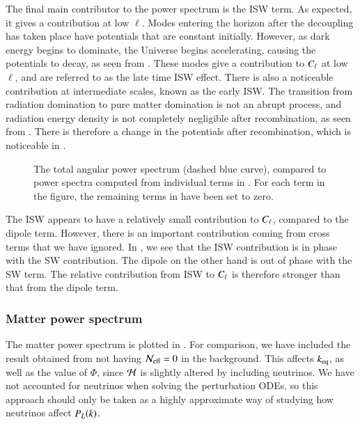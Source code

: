 The final main contributor to the power spectrum is the ISW term. As expected, it gives a contribution at low $\ell$. Modes entering the horizon after the decoupling has taken place have potentials that are constant initially. However, as dark energy begins to dominate, the Universe begins accelerating, causing the potentials to decay, as seen from . These modes give a contribution to $C_\ell$ at low $\ell$, and are referred to as the late time ISW effect. There is also a noticeable contribution at intermediate scales, known as the early ISW. The transition from radiation domination to pure matter domination is not an abrupt process, and radiation energy density is not completely negligible after recombination, as seen from . There is therefore a change in the potentials after recombination, which is noticeable in .  
\begin{figure}[ht!]
    \caption{The total angular power spectrum (dashed blue curve), compared to power spectra computed from individual terms in . For each term in the figure, the remaining terms in  have been set to zero.}
    \label{fig:M4:results:cells_components}
\end{figure}

The ISW appears to have a relatively small contribution to $C_\ell$, compared to the dipole term. However, there is an important contribution coming from cross terms that we have ignored. In , we see that the ISW contribution is in phase with the SW contribution. The dipole on the other hand is out of phase with the SW term. The relative contribution from ISW to $C_\ell$ is therefore stronger than that from the dipole term.    

\subsubsection{Matter power spectrum} \label{sssec:M4:results:matter_power_spectrum}
The matter power spectrum is plotted in . For comparison, we have included the result obtained from not having $\mathcal{N}_\mathrm{eff}=0$ in the background. This affects $k_\mathrm{eq}$, as well as the value of $\Phi$, since $\mathcal{H}$ is slightly altered by including neutrinos. We have not accounted for neutrinos when solving the perturbation ODEs, so this approach should only be taken as a highly approximate way of studying how neutrinos affect $P_L(k)$. 

